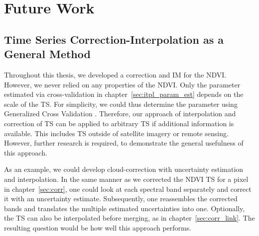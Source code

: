 \section{Future Work}{
    \label{sec:FutureWork}

    \subsection{Time Series Correction-Interpolation as a General Method}{
        Throughout this thesis, we developed a correction and {{IM}} for the NDVI. However, we never relied on any properties of the NDVI. Only the parameter estimated via cross-validation in chapter~\ref{sec:itpl_param_est} depends on the scale of the {TS}. For simplicity, we could thus determine the parameter using Generalized Cross Validation \citep{ripleyFitSmoothingSpline2022}. Therefore, our approach of interpolation and correction of {TS} can be applied to arbitrary {TS} if additional information is available. This includes TS outside of satellite imagery or remote sensing. However, further research is required, to demonstrate the general usefulness of this approach.

        As an example, we could develop cloud-correction with uncertainty estimation and interpolation.
        In the same manner as we corrected the NDVI {TS} for a pixel in chapter~\ref{sec:corr}, one could look at each spectral band separately and correct it with an uncertainty estimate. Subsequently, one reassembles the corrected bands and translates the multiple estimated uncertainties into one. Optionally, the {TS} can also be interpolated before merging, as in chapter~\ref{sec:corr_link}. The resulting question would be how well this approach performs.
    }



}

